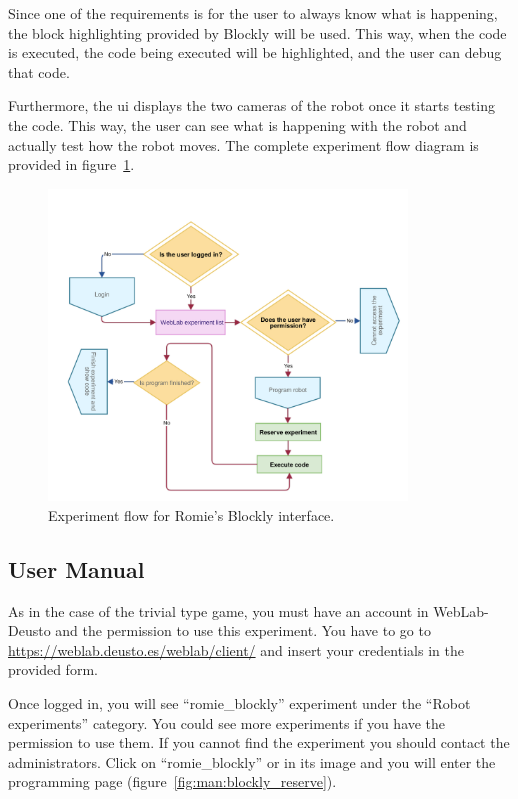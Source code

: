 Since one of the requirements is for the user to always know what is happening, the block
highlighting provided by Blockly will be used. This way, when the code is executed, the code being
executed will be highlighted, and the user can debug that code.

Furthermore, the \acrlong{ui} displays the two cameras of the robot once it starts testing the code.
This way, the user can see what is happening with the robot and actually test how the robot moves.
The complete experiment flow diagram is provided in figure~\ref{fig:blockly_flow}.

\begin{figure}[!htbp]
	\centering
	\includegraphics[width=0.85\textwidth]{fig/blockly-experiment-flow}
	\caption{Experiment flow for Romie's Blockly interface.}
	\label{fig:blockly_flow}
\end{figure}

\subsection{User Manual}

As in the case of the trivial type game, you must have an account in WebLab-Deusto and the
permission to use this experiment. You have to go to \url{https://weblab.deusto.es/weblab/client/}
and insert your credentials in the provided form.

Once logged in, you will see ``romie\_blockly'' experiment under the ``Robot experiments'' category.
You could see more experiments if you have the permission to use them. If you cannot find the
experiment you should contact the administrators. Click on ``romie\_blockly'' or in its image and
you will enter the programming page (figure~\ref{fig:man:blockly_reserve}).

